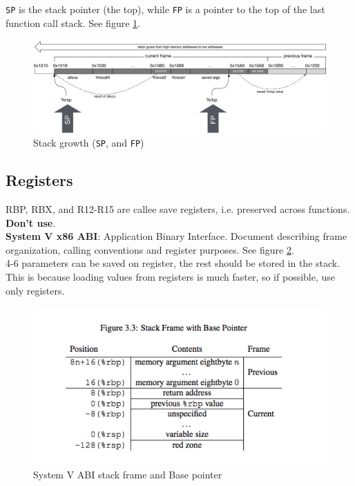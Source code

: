\texttt{SP} is the stack pointer (the top), while \texttt{FP} is a pointer to the top of the last function call stack. See figure \ref{fig:stack}.

\begin{figure}[H]
    \centering
    \includegraphics[width=\textwidth]{assets/stack.PNG}
    \caption{Stack growth (\texttt{SP}, and \texttt{FP})}
    \label{fig:stack}
\end{figure}

\subsection{Registers}
RBP, RBX, and R12-R15 are callee save registers, i.e. preserved across functions. \textbf{Don't use}.\\

\textbf{System V x86 ABI}: Application Binary Interface. Document describing frame organization, calling conventions and register purposes. See figure \ref{fig:sys_abi}.\\

4-6 parameters can be saved on register, the rest should be stored in the stack. This is because loading values from registers is much faster, so if possible, use only registers.

\begin{figure}[H]
    \centering
    \includegraphics[scale=0.5]{assets/system V ABI.PNG}
    \caption{System V ABI stack frame and Base pointer}
    \label{fig:sys_abi}
\end{figure}

